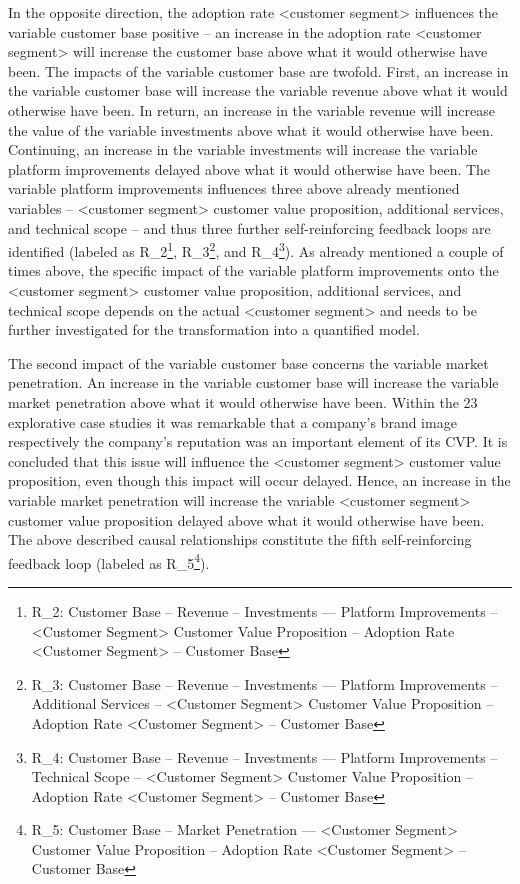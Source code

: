 In the opposite direction, the adoption rate <customer segment> influences the variable customer base positive -- an increase in the adoption rate <customer segment> will increase the customer base above what it would otherwise have been. The impacts of the variable customer base are twofold. First, an increase in the variable customer base will increase the variable revenue above what it would otherwise have been. In return, an increase in the variable revenue will increase the value of the variable investments above what it would otherwise have been. Continuing, an increase in the variable investments will increase the variable platform improvements delayed above what it would otherwise have been. The variable platform improvements influences three above already mentioned variables -- <customer segment> customer value proposition, additional services, and technical scope -- and thus three further self-reinforcing feedback loops are identified (labeled as R\_2\footnote{R\_2: Customer Base -- Revenue -- Investments --- Platform Improvements -- <Customer Segment> Customer Value Proposition -- Adoption Rate <Customer Segment> -- Customer Base}, R\_3\footnote{R\_3: Customer Base -- Revenue -- Investments --- Platform Improvements -- Additional Services -- <Customer Segment> Customer Value Proposition -- Adoption Rate <Customer Segment> -- Customer Base}, and R\_4\footnote{R\_4: Customer Base -- Revenue -- Investments --- Platform Improvements -- Technical Scope -- <Customer Segment> Customer Value Proposition -- Adoption Rate <Customer Segment> -- Customer Base}). As already mentioned a couple of times above, the specific impact of the variable platform improvements onto the <customer segment> customer value proposition, additional services, and technical scope depends on the actual <customer segment> and needs to be further investigated for the transformation into a quantified model.

The second impact of the variable customer base concerns the variable market penetration. An increase in the variable customer base will increase the variable market penetration above what it would otherwise have been. Within the 23 explorative case studies it was remarkable that a company's brand image respectively the company's reputation was an important element of its \ac{CVP}. It is concluded that this issue will influence the <customer segment> customer value proposition, even though this impact will occur delayed. Hence, an increase in the variable market penetration will increase the variable <customer segment> customer value proposition delayed above what it would otherwise have been. The above described causal relationships constitute the fifth self-reinforcing feedback loop (labeled as R\_5\footnote{R\_5: Customer Base -- Market Penetration --- <Customer Segment> Customer Value Proposition -- Adoption Rate <Customer Segment> -- Customer Base}).

